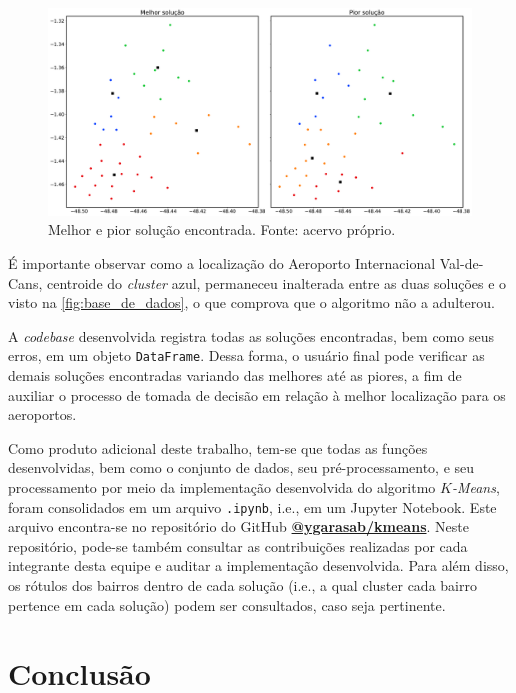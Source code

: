 \documentclass[12pt]{article}
\begin{document}
\begin{figure}[t!]
    \includegraphics[width=\linewidth]{figures/resultados}
    \caption{Melhor e pior solução encontrada. Fonte: acervo próprio.}
    \label{fig:resultados}
\end{figure}

É importante observar como a localização do Aeroporto Internacional Val-de-Cans, centroide do \textit{cluster} azul, permaneceu inalterada entre as duas soluções e o visto na \autoref{fig:base_de_dados}, o que comprova que o algoritmo não a adulterou.

A \textit{codebase} desenvolvida registra todas as soluções encontradas, bem como seus erros, em um objeto \texttt{DataFrame}. Dessa forma, o usuário final pode verificar as demais soluções encontradas variando das melhores até as piores, a fim de auxiliar o processo de tomada de decisão em relação à melhor localização para os aeroportos.

Como produto adicional deste trabalho, tem-se que todas as funções desenvolvidas, bem como o conjunto de dados, seu pré-processamento, e seu processamento por meio da implementação desenvolvida do algoritmo \textit{$K$-Means}, foram consolidados em um arquivo \texttt{.ipynb}, i.e., em um Jupyter Notebook. Este arquivo encontra-se no repositório do GitHub \textbf{\href{https://github.com/ygarasab/kmeans}{@ygarasab/kmeans}}. Neste repositório, pode-se também consultar as contribuições realizadas por cada integrante desta equipe e auditar a implementação desenvolvida. Para além disso, os rótulos dos bairros dentro de cada solução (i.e., a qual cluster cada bairro pertence em cada solução) podem ser consultados, caso seja pertinente.


\section{Conclusão}   %
\label{sec:conclusao} %
\end{document}
